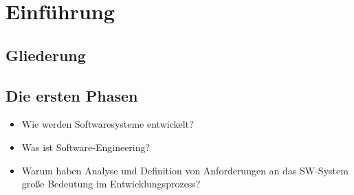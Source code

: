 \newcommand{\customDir}{../}








%



\maketitle
\newpage
\tableofcontents
\newpage

\chapter{Einführung}

\section{Gliederung}

\section{Die ersten Phasen}
\begin{itemize}
\item Wie werden Softwaresysteme entwickelt?
\item Was ist Software-Engineering?
\item Warum haben Analyse und Definition von Anforderungen an das SW-System große Bedeutung im Entwicklungsprozess?
\end{itemize}

